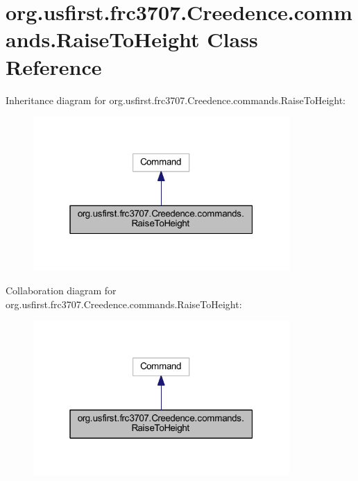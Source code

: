 \hypertarget{classorg_1_1usfirst_1_1frc3707_1_1_creedence_1_1commands_1_1_raise_to_height}{}\section{org.\+usfirst.\+frc3707.\+Creedence.\+commands.\+Raise\+To\+Height Class Reference}
\label{classorg_1_1usfirst_1_1frc3707_1_1_creedence_1_1commands_1_1_raise_to_height}


Inheritance diagram for org.\+usfirst.\+frc3707.\+Creedence.\+commands.\+Raise\+To\+Height\+:
\nopagebreak
\begin{figure}[H]
\begin{center}
\leavevmode
\includegraphics[width=277pt]{classorg_1_1usfirst_1_1frc3707_1_1_creedence_1_1commands_1_1_raise_to_height__inherit__graph}
\end{center}
\end{figure}


Collaboration diagram for org.\+usfirst.\+frc3707.\+Creedence.\+commands.\+Raise\+To\+Height\+:
\nopagebreak
\begin{figure}[H]
\begin{center}
\leavevmode
\includegraphics[width=277pt]{classorg_1_1usfirst_1_1frc3707_1_1_creedence_1_1commands_1_1_raise_to_height__coll__graph}
\end{center}
\end{figure}
